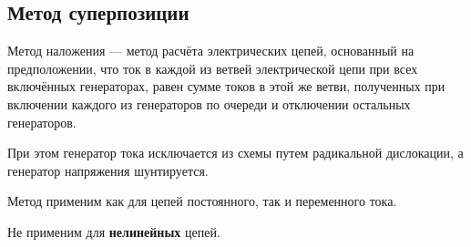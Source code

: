\subsection{Метод суперпозиции}

Метод наложения — метод расчёта электрических цепей, основанный на предположении, что ток в каждой из ветвей электрической цепи при всех включённых генераторах, равен сумме токов в этой же ветви, полученных при включении каждого из генераторов по очереди и отключении остальных генераторов.

При этом генератор тока исключается из схемы путем радикальной дислокации, а генератор напряжения шунтируется.

Метод применим как для цепей постоянного, так и переменного тока.

Не применим для \textbf{нелинейных} цепей.



\pagebreak